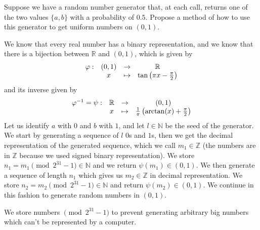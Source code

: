 \documentclass[fontsize=12pt, usenames, dvipsnames, headinclude, headsepline, footinclude, footsepline]{scrartcl}
\newcommand{\N}{\mathbb{N}}
\newcommand{\R}{\mathbb{R}}
\newcommand{\Z}{\mathbb{Z}}
\renewcommand{\phi}{\varphi}
\begin{document}
\begin{exo}
  Suppose we have a random number generator that, at each call, returns one of the two values $\{a, b\}$ with a
  probability of $0.5$. Propose a method of how to use this generator to get uniform numbers on $(0, 1)$.
\end{exo}

\begin{sol}
  We know that every real number has a binary representation, and we know that there is a bijection between
  $\R$ and $(0,1)$, which is given by 
  \[
    \begin{array}{c c c c}
      \phi: & (0,1) & \to & \R\\
      & x & \mapsto & \tan\left(\pi x - \frac{\pi}{2}\right)
    \end{array}
  \]
  and its inverse given by
  \[
    \begin{array}{c c c c}
      \phi^{-1} = \psi: & \R & \to & (0,1)\\
      & x & \mapsto & \frac{1}{\pi}\left(\arctan(x) + \frac{\pi}{2}\right)
    \end{array}
  \]
  Let us identify $a$ with $0$ and $b$ with $1$, and let $l \in \N$ be the seed of the generator. We start by
  generating a sequence of $l$ $0$s and $1$s, then we get the decimal representation of the generated
  sequence, which we call $m_1 \in \Z$ (the numbers are in $\Z$ because we used signed binary
  representation). We store $n_1 = m_1 \pmod {2^{31}-1} \in \N$ and we return $\psi(m_1) \in (0,1)$. We then generate
  a sequence of length $n_1$ which gives us $m_2 \in \Z$ in decimal representation. We store
  $n_2 = m_2 \pmod{2^{31} -1} \in \N$ and return $\psi(m_2) \in (0,1)$. We continue in this fashion to generate random numbers
  in $(0,1)$.

  We store numbers $\pmod{2^{31} - 1}$ to prevent generating arbitrary big numbers which can't be represented
  by a computer.
\end{sol}


	
\end{document}
